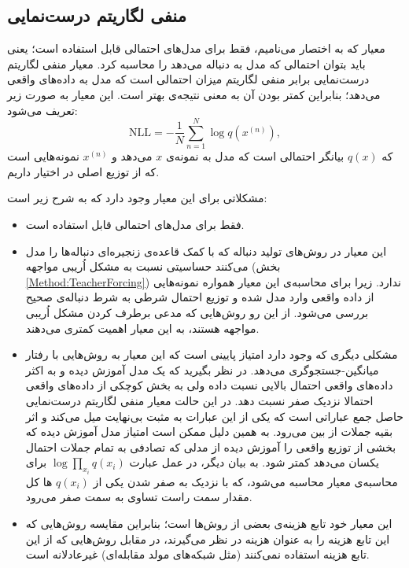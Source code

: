 \subsection{منفی لگاریتم درست‌نمایی}\label{Metric:NLLModel}
معیار
که به اختصار
می‌نامیم، فقط برای مدل‌های احتمالی قابل استفاده است؛ یعنی باید بتوان احتمالی که مدل به دنباله می‌دهد را محاسبه کرد. معیار  منفی لگاریتم درست‌نمایی 
برابر منفی لگاریتم میزان احتمالی است که مدل به داده‌های واقعی می‌دهد؛ بنابراین کمتر بودن آن به معنی نتیجه‌ی بهتر است.
این معیار به صورت زیر تعریف می‌شود:
\begin{equation}
\text{NLL} = - \frac{1}{N} \sum_{n=1}^N \log  q(x^{(n)}),
\end{equation}
که $q(x)$ بیانگر احتمالی است که مدل به نمونه‌ی $x$ می‌دهد و  $x^{(n)}$  نمونه‌هایی است که از توزیع اصلی در اختیار داریم.

مشکلاتی برای این معیار وجود دارد که به شرح زیر است:
\begin{itemize}
	\item
	فقط برای مدل‌های احتمالی قابل استفاده است.
	\item 
	این معیار در روش‌های تولید دنباله که با کمک قاعده‌ی زنجیره‌ای دنباله‌ها را مدل می‌کنند  حساسیتی نسبت به مشکل اُریبی مواجهه 
	(بخش \ref{Method:TeacherForcing})
	ندارد. زیرا برای محاسبه‌ی این معیار همواره نمونه‌هایی از داده‌ واقعی وارد مدل شده و توزیع احتمال شرطی به شرط دنباله‌ی صحیح بررسی می‌شود.
	از این رو روش‌هایی که مدعی برطرف کردن مشکل اُریبی مواجهه	هستند، به این معیار اهمیت کمتری می‌دهند. 
	\item 
	مشکلی دیگری که وجود دارد امتیاز پایینی است که این معیار به روش‌هایی با رفتار میانگین-جستجوگری	می‌دهد. در نظر بگیرید که یک مدل آموزش دیده و به اکثر داده‌های واقعی احتمال بالایی نسبت داده ولی به بخش کوچکی از داده‌های واقعی احتمالا نزدیک صفر نسبت دهد. در این حالت معیار منفی لگاریتم درست‌نمایی حاصل جمع عباراتی است که یکی از این عبارات به مثبت بی‌نهایت میل می‌کند و اثر بقیه جملات از بین می‌رود. به همین دلیل ممکن است امتیاز مدل آموزش دیده که بخشی از توزیع واقعی را آموزش دیده از مدلی که تصادفی به تمام جملات احتمال یکسان می‌دهد کمتر شود.
	به بیان دیگر، در عمل عبارت
	$\log \prod_{x_i} q(x_i)$
	برای محاسبه‌ی معیار محاسبه می‌شود، که با نزدیک به صفر شدن یکی از $q(x_i)$ ها کل مقدار سمت راست تساوی  به سمت صفر می‌رود.
	\item
	این معیار خود تابع هزینه‌ی بعضی از روش‌ها است؛ بنابراین مقایسه روش‌هایی که این تابع هزینه را به عنوان هزینه در نظر می‌گیرند، در مقابل روش‌هایی که از این تابع هزینه استفاده نمی‌کنند (مثل شبکه‌های مولد مقابله‌ای) غیرعادلانه است.
\end{itemize}

